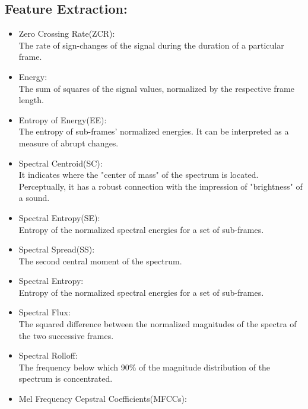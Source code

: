 \subsection{Feature Extraction:}
\begin{itemize}
	\item Zero Crossing Rate(ZCR):\\
	The rate of sign-changes of the signal during the duration of a particular frame.\cite{b1}\\
	\item Energy:\\
	The sum of squares of the signal values, normalized by the respective frame length.\cite{b2}\\
	\item Entropy of Energy(EE):\\
	The entropy of sub-frames' normalized energies. It can be interpreted as a measure of abrupt changes.\cite{b2}\\
	\item Spectral Centroid(SC):\\
	It indicates where the "center of mass" of the spectrum is located. Perceptually, it has a robust connection with the impression of "brightness" of a sound.\cite{b3}\\
	\item Spectral Entropy(SE):\cite{b1}\\
	Entropy of the normalized spectral energies for a set of sub-frames.\cite{b3}\\
	\item Spectral Spread(SS):\\
	The second central moment of the spectrum.\cite{b3}\\
	\item Spectral Entropy:\\
	Entropy of the normalized spectral energies for a set of sub-frames.\cite{b3}\\
	\item Spectral Flux:\\
	The squared difference between the normalized magnitudes of the spectra of the two successive frames.\cite{b3}\\
	\item Spectral Rolloff:\\
	The frequency below which 90\% of the magnitude distribution of the spectrum is concentrated.\cite{b3}\\
	\item Mel Frequency Cepstral Coefficients(MFCCs):\\

\end{itemize}
